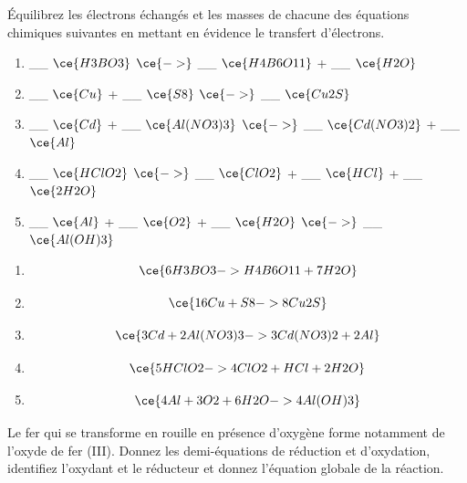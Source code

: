 \documentclass[
  11pt,
  a4paper,
  openany]{book}
\providecommand{\tightlist}{%
  \setlength{\itemsep}{0pt}\setlength{\parskip}{0pt}}
\begin{document}
\begin{Exercise}

Équilibrez les électrons échangés et les masses de chacune des équations chimiques suivantes en mettant en évidence le transfert d'électrons.

\begin{enumerate}
\def\labelenumi{\alph{enumi}.}
\tightlist
\item
  \_\_ \(\ce{H3BO3}\) \(\ce{->}\) \_\_ \(\ce{H4B6O11}\) + \_\_ \(\ce{H2O}\)
  \vspace{1em}
\item
  \_\_ \(\ce{Cu}\) + \_\_ \(\ce{S8}\) \(\ce{->}\) \_\_ \(\ce{Cu2S}\)
  \vspace{1em}
\item
  \_\_ \(\ce{Cd}\) + \_\_ \(\ce{Al(NO3)3}\) \(\ce{->}\) \_\_ \(\ce{Cd(NO3)2}\) + \_\_ \(\ce{Al}\)
  \vspace{1em}
\item
  \_\_ \(\ce{HClO2}\) \(\ce{->}\) \_\_ \(\ce{ClO2}\) + \_\_ \(\ce{HCl}\) + \_\_ \(\ce{2 H2O}\)
  \vspace{1em}
\item
  \_\_ \(\ce{Al}\) + \_\_ \(\ce{O2}\) + \_\_ \(\ce{H2O}\) \(\ce{->}\) \_\_ \(\ce{Al(OH)3}\)
  \vspace{1em}
\end{enumerate}

\end{Exercise}

\begin{Answer}

\begin{enumerate}
\def\labelenumi{\alph{enumi}.}
\tightlist
\item
  \[
  \ce{6 H3BO3  -> H4B6O11 + 7 H2O}
  \]
\item
  \[
  \ce{16 Cu + S8  -> 8 Cu2S}
  \]
\item
  \[
  \ce{3 Cd + 2 Al(NO3)3  -> 3 Cd(NO3)2 + 2 Al}
  \]
\item
  \[
  \ce{5 HClO2  -> 4 ClO2 + HCl + 2 H2O}
  \]
\item
  \[
  \ce{4 Al + 3 O2 + 6 H2O -> 4 Al(OH)3}
  \]
\end{enumerate}

\end{Answer}

\clearpage

\begin{Exercise}
Le fer qui se transforme en rouille en présence d'oxygène forme notamment de l'oxyde de fer (III). Donnez les demi-équations de réduction et d'oxydation, identifiez l'oxydant et le réducteur et donnez l'équation globale de la réaction.

\end{Exercise}
\end{document}
